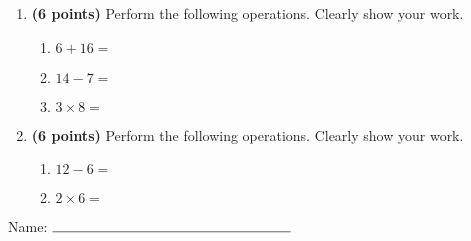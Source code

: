 \documentclass[12pt]{amsart}
\begin{document}
\newpage
\begin{enumerate}
\item {\bf (6 points)} 
 Perform the following operations. Clearly show your work. \begin{enumerate}


\def \a{6}\def \b{16}\def \apb{22}

 
\item $\a + \b = $

\vspace{2cm}
\def \a{14}\def \dif{7}\def \b{7}

 
\item $\a - \b = $

\vspace{2cm}
\def \a{3}\def \b{8}\def \ab{11}

 
\item $\a \times \b = $ 

\vspace{2cm}
\def \vshift{1}\def \hshift{-4}\def \chang{2}\def \findval{-2}\def \yval{-3}

 
\end{enumerate}


\newpage
\item {\bf (6 points)} 
 Perform the following operations. Clearly show your work. \begin{enumerate}


\def \a{12}\def \dif{6}\def \b{6}

 
\item $\a - \b = $

\vspace{2cm}
\def \a{2}\def \b{6}\def \ab{8}

 
\item $\a \times \b = $ 

\vspace{2cm}
\def \vshift{1}\def \hshift{-2}\def \chang{1}\def \findval{-1}\def \yval{-1}

 
\end{enumerate}


\newpage\end{enumerate}\graphicspath{{C:/Users/iainc/anaconda3/Randomizer/Sample Course/Sample Assessment 2/}}\setcounter{page}{1}


\thispagestyle{fancy}

 
\noindent Name: $\rule{6cm}{0.15mm}$

\vspace{.2cm}
\end{document}
